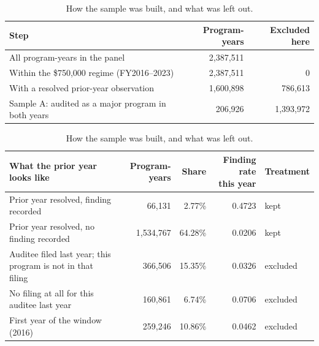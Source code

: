 \begin{table}[tbp]
\centering
\caption{How the sample was built, and what was left out.}
\label{tab:sample}
\footnotesize
\setlength{\tabcolsep}{3pt}
\begin{tabular}{lrr}
\toprule
Step & Program-years & Excluded here \\
\midrule
All program-years in the panel & 2,387,511 &  \\
Within the \$750,000 regime (FY2016--2023) & 2,387,511 & 0 \\
With a resolved prior-year observation & 1,600,898 & 786,613 \\
Sample A: audited as a major program in both years & 206,926 & 1,393,972 \\
\bottomrule
\end{tabular}

\vspace{1.1em}

\footnotesize
\begin{tabular}{lrrrl}
\toprule
What the prior year looks like & Program-years & Share & \shortstack{Finding rate\\this year} & Treatment \\
\midrule
Prior year resolved, finding recorded & 66,131 & 2.77\% & 0.4723 & kept \\
Prior year resolved, no finding recorded & 1,534,767 & 64.28\% & 0.0206 & kept \\
Auditee filed last year; this program is not in that filing & 366,506 & 15.35\% & 0.0326 & excluded \\
No filing at all for this auditee last year & 160,861 & 6.74\% & 0.0706 & excluded \\
First year of the window (2016) & 259,246 & 10.86\% & 0.0462 & excluded \\
\bottomrule
\end{tabular}
\end{table}

